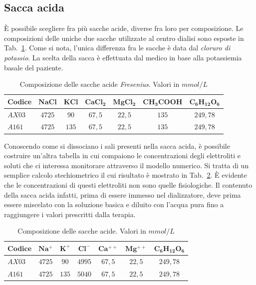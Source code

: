 \subsection{Sacca acida}
È possibile scegliere fra più sacche acide, diverse fra loro per composizione. Le composizioni delle uniche due sacche utilizzate al centro dialisi sono esposte in Tab.~\ref{tab:acida}. Come si nota, l'unica differenza fra le sacche è data dal \textit{cloruro di potassio}. La scelta della sacca è effettuata dal medico in base alla potassiemia basale del paziente.
\begin{table}[htb]
	\centering
	\caption{Composizione delle sacche acide \textit{Fresenius}. Valori in $mmol/L$}
	\begin{tabular}{lcccccc}
	\toprule 
		\textbf{Codice} & $\mathbf{NaCl}$ & $\mathbf{KCl}$ & $\mathbf{CaCl_2}$ & $\mathbf{MgCl_2}$ & $\mathbf{CH_3COOH}$ & $\mathbf{C_6 H_{12} O_6}$ \\
  \midrule
  	$AX03$ & $4725$ & $90$  & $67,5$   & $22,5$   & $135$      & $249,78$         \\
  	$A161$ & $4725$ & $135$ & $67,5$   & $22,5$   & $135$      & $249,78$         \\
  \bottomrule
\end{tabular}\label{tab:acida}
\end{table}
Conoscendo come si dissociano i sali presenti nella sacca acida, è possibile costruire un'altra tabella in cui compaiono le concentrazioni degli elettroliti e soluti che ci interessa monitorare attraverso il modello numerico. Si tratta di un semplice calcolo stechiometrico il cui risultato è mostrato in Tab.~\ref{tab:acida2}. È evidente che le concentrazioni di questi elettroliti non sono quelle fisiologiche. Il contenuto della sacca acida infatti, prima di essere immesso nel dializzatore, deve prima essere miscelato con la soluzione basica e diluito con l'acqua pura fino a raggiungere i valori prescritti dalla terapia.
\begin{table}[htb]
	\centering
	\caption{Composizione delle sacche acide. Valori in $mmol/L$}
	\begin{tabular}{lcccccc}
	\toprule 
		\textbf{Codice} & $\mathbf{Na^+}$ & $\mathbf{K^+}$ & $\mathbf{Cl^-}$ & $\mathbf{Ca^{++}}$ & $\mathbf{Mg^{++}}$ &  $\mathbf{C_6 H_{12} O_6}$ \\
  \midrule
  	$AX03$ & $4725$ & $90$  & $4995$ & $67,5$    & $22,5$    & $249,78$          \\
  	$A161$ & $4725$ & $135$ & $5040$ & $67,5$    & $22,5$    & $249,78$          \\
  \bottomrule
\end{tabular}\label{tab:acida2}
\end{table}

